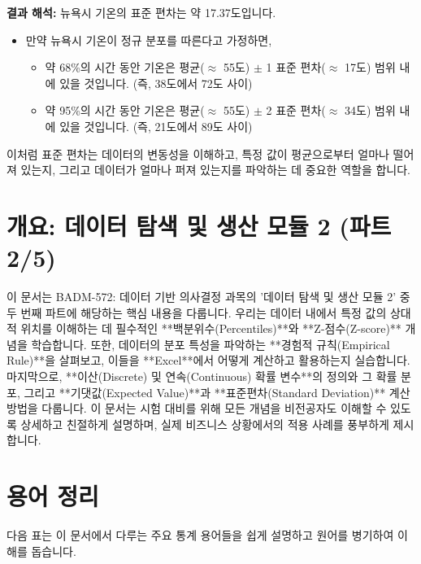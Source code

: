 \documentclass[11pt,a4paper]{article}
\begin{document}
\begin{tcolorbox}[examplebox={Excel에서 표준 편차 계산하기 (\texttt{STDEV.S} 함수)}]
\textbf{결과 해석:}
뉴욕시 기온의 표준 편차는 약 17.37도입니다.
\begin{itemize}
    \item 만약 뉴욕시 기온이 정규 분포를 따른다고 가정하면,
    \begin{itemize}
        \item 약 68\%의 시간 동안 기온은 평균($\approx$ 55도) $\pm$ 1 표준 편차($\approx$ 17도) 범위 내에 있을 것입니다. (즉, 38도에서 72도 사이)
        \item 약 95\%의 시간 동안 기온은 평균($\approx$ 55도) $\pm$ 2 표준 편차($\approx$ 34도) 범위 내에 있을 것입니다. (즉, 21도에서 89도 사이)
    \end{itemize}
\end{itemize}
이처럼 표준 편차는 데이터의 변동성을 이해하고, 특정 값이 평균으로부터 얼마나 떨어져 있는지, 그리고 데이터가 얼마나 퍼져 있는지를 파악하는 데 중요한 역할을 합니다.
\end{tcolorbox}

\newpage

\newpage
\section*{개요: 데이터 탐색 및 생산 모듈 2 (파트 2/5)}

이 문서는 BADM-572: 데이터 기반 의사결정 과목의 '데이터 탐색 및 생산 모듈 2' 중 두 번째 파트에 해당하는 핵심 내용을 다룹니다. 우리는 데이터 내에서 특정 값의 상대적 위치를 이해하는 데 필수적인 **백분위수(Percentiles)**와 **Z-점수(Z-score)** 개념을 학습합니다. 또한, 데이터의 분포 특성을 파악하는 **경험적 규칙(Empirical Rule)**을 살펴보고, 이들을 **Excel**에서 어떻게 계산하고 활용하는지 실습합니다. 마지막으로, **이산(Discrete) 및 연속(Continuous) 확률 변수**의 정의와 그 확률 분포, 그리고 **기댓값(Expected Value)**과 **표준편차(Standard Deviation)** 계산 방법을 다룹니다. 이 문서는 시험 대비를 위해 모든 개념을 비전공자도 이해할 수 있도록 상세하고 친절하게 설명하며, 실제 비즈니스 상황에서의 적용 사례를 풍부하게 제시합니다.

\newpage
\section*{용어 정리}

다음 표는 이 문서에서 다루는 주요 통계 용어들을 쉽게 설명하고 원어를 병기하여 이해를 돕습니다.
\end{document}
